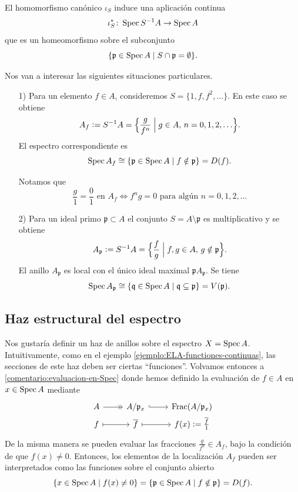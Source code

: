 \documentclass{article}
\numberwithin{equation}{section}
\theoremstyle{definition}
\begin{document}
El homomorfismo canónico $\iota_S$ induce una aplicación continua
$$\iota_S^*\colon \operatorname{Spec} S^{-1} A \to \operatorname{Spec} A$$
que es un homeomorfismo sobre el subconjunto
$$\{ \mathfrak{p} \in \operatorname{Spec} A \mid S \cap \mathfrak{p} = \emptyset \}.$$

Nos van a interesar las siguientes situaciones particulares.

\begin{enumerate}
\item[1)] Para un elemento $f \in A$, consideremos
  $S = \{ 1,f,f^2,\ldots \}$. En este caso se obtiene
  $$A_f \mathrel{\mathop:}= S^{-1} A = \Bigl\{ \frac{g}{f^n} \Bigm| g \in A, \, n = 0,1,2,\ldots \Bigr\}.$$
  El espectro correspondiente es
  $$\operatorname{Spec} A_f \cong \{ \mathfrak{p} \in \operatorname{Spec} A \mid f \notin \mathfrak{p} \} = D (f).$$

  Notamos que
  $$\frac{g}{1} = \frac{0}{1} \text{ en }A_f \iff f^n g = 0 \text{ para algún }n=0,1,2,\ldots$$

\item[2)] Para un ideal primo $\mathfrak{p} \subset A$ el conjunto
  $S = A\setminus \mathfrak{p}$ es multiplicativo y se obtiene
  \[ A_\mathfrak{p} \mathrel{\mathop:}= S^{-1} A =
    \Bigl\{ \frac{f}{g} \Bigm| f,g \in A, \, g \notin \mathfrak{p} \Bigr\}. \]
  El anillo $A_\mathfrak{p}$ es local con el único ideal maximal
  $\mathfrak{p} A_\mathfrak{p}$. Se tiene
  \[ \operatorname{Spec} A_\mathfrak{p} \cong
     \{ \mathfrak{q} \in \operatorname{Spec} A \mid \mathfrak{q} \subseteq \mathfrak{p} \} =
     V (\mathfrak{p}). \]
\end{enumerate}

\subsection{Haz estructural del espectro}
\label{sec:O-Spec-A}

Nos gustaría definir un haz de anillos sobre el espectro
$X = \operatorname{Spec} A$. Intuitivamente, como en el ejemplo
\ref{ejemplo:ELA-functiones-continuas}, las secciones de este haz deben ser
ciertas ``funciones''. Volvamos entonces a \ref{comentario:evaluacion-en-Spec}
donde hemos definido la evaluación de $f \in A$ en $x \in \operatorname{Spec} A$ mediante
\[ \begin{tikzcd}[row sep=0pt]
    A \ar[->>]{r} & A/\mathfrak{p}_x \ar[hookrightarrow]{r} & \Frac (A/\mathfrak{p}_x) \\
    f \ar[|->]{r} & \overline{f} \ar[|->]{r} & f (x) \dfn \frac{\overline{f}}{1}
  \end{tikzcd} \]
De la misma manera se pueden evaluar las fracciones $\frac{g}{f^n} \in A_f$,
bajo la condición de que $f (x) \ne 0$. Entonces, los elementos de la
localización $A_f$ pueden ser interpretados como las funciones sobre el conjunto
abierto
\[ \{ x \in \operatorname{Spec} A \mid f (x) \ne 0 \} =
   \{ \mathfrak{p} \in \operatorname{Spec} A \mid f \notin \mathfrak{p} \} = D (f). \]
\end{document}
